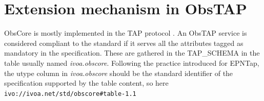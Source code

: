 \documentclass[11pt,a4paper]{ivoa}
\begin{document}
%

 \section{Extension mechanism in ObsTAP }
 \label{sec:comext}
 ObsCore is mostly implemented in the TAP protocol \citep{2019ivoa.spec.0927D}.
 An ObsTAP service is considered compliant to the standard if it serves all the attributes tagged as mandatory in the specification.
 These are gathered in the TAP\_SCHEMA in the table usually named \emph{ivoa.obscore}.
 Following the practice introduced  for EPNTap,  the utype column in \emph{ivoa.obscore} should be the standard identifier of the specification supported by the table content, so here \texttt{ivo://ivoa.net/std/obscore\#table-1.1}
\end{document}
